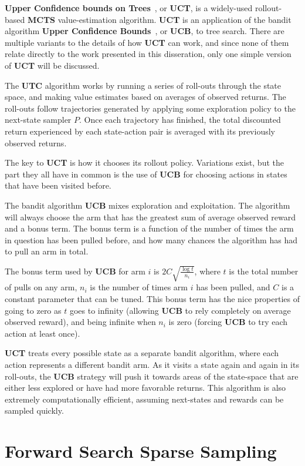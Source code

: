 {\bf Upper Confidence bounds on Trees}~\cite{kocsis06}, or {\bf UCT}, is a widely-used rollout-based {\bf MCTS} value-estimation algorithm. {\bf UCT} is an application of the bandit algorithm {\bf Upper Confidence Bounds}~\cite{auer02}, or {\bf UCB}, to tree search. There are multiple variants to the details of how {\bf UCT} can work, and since none of them relate directly to the work presented in this disseration, only one simple version of {\bf UCT} will be discussed.

The {\bf UTC} algorithm works by running a series of roll-outs through the state space, and making value estimates based on averages of observed returns. The roll-outs follow trajectories generated by applying some exploration policy to the next-state sampler $P$. Once each trajectory has finished, the total discounted return experienced by each state-action pair is averaged with its previously observed returns.

The key to {\bf UCT} is how it chooses its rollout policy. Variations exist, but the part they all have in common is the use of {\bf UCB} for choosing actions in states that have been visited before.

The bandit algorithm {\bf UCB} mixes exploration and exploitation. The algorithm will always choose the arm that has the greatest sum of average observed reward and a bonus term. The bonus term is a function of the number of times the arm in question has been pulled before, and how many chances the algorithm has had to pull an arm in total.

The bonus term used by {\bf UCB} for arm $i$ is $2 C \sqrt{\frac{\log t}{n_i}}$, where $t$ is the total number of pulls on any arm, $n_i$ is the number of times arm $i$ has been pulled, and $C$ is a constant parameter that can be tuned. This bonus term has the nice properties of going to zero as $t$ goes to infinity (allowing {\bf UCB} to rely completely on average observed reward), and being infinite when $n_i$ is zero (forcing {\bf UCB} to try each action at least once).

{\bf UCT} treats every possible state as a separate bandit algorithm, where each action represents a different bandit arm. As it visits a state again and again in its roll-outs, the {\bf UCB} strategy will push it towards areas of the state-space that are either less explored or have had more favorable returns. This algorithm is also extremely computationally efficient, assuming next-states and rewards can be sampled quickly.

\section{Forward Search Sparse Sampling}

